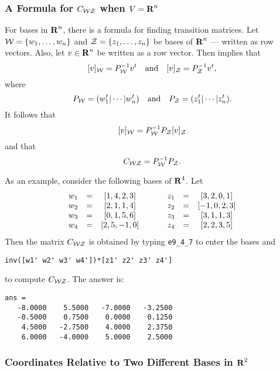 \subsubsection*{A Formula for $C_{\cal WZ}$ when $V=\mbox{$\bf{R}$}^n$}

For bases in $\mbox{$\bf{R}$}^n$, there is a formula for finding transition
matrices.  Let ${\cal W} =\{w_1,\ldots,w_n\}$
and ${\cal Z} = \{z_1,\ldots,z_n\}$ be bases of $\mbox{$\bf{R}$}^n$ --- written as row
vectors.
Also, let $v\in\mbox{$\bf{R}$}^n$ be written as a row vector.  Then 
implies that
\[
[v]_{\cal W} = P_{\cal W}^{-1} v^t \quad\mbox{and}\quad [v]_{\cal Z} = P_{\cal Z}^{-1} v^t,
\]
where
\[
P_{\cal W} = (w_1^t|\cdots|w_n^t) \quad\mbox{and}\quad  P_{\cal Z} = (z_1^t|\cdots|z_n^t).
\]
It follows that
\[
[v]_{\cal W} = P_{\cal W}^{-1} P_{\cal Z} [v]_{\cal Z}
\]
and that
\begin{equation} \label{e:coordformn}
C_{\cal WZ} = P_{\cal W}^{-1} P_{\cal Z}.
\end{equation}

As an example, consider the following bases of $\mbox{$\bf{R}$}^4$.  Let
\begin{equation*}
\begin{array}{ccccccc}
w_1 & = & [1, 4, 2, 3] & \hspace{0.2in} & z_1 & = & [3, 2, 0, 1] \\
w_2 & = & [2, 1, 1, 4] &  		    & z_2 & = & [-1, 0, 2, 3] \\
w_3 & = & [0, 1, 5, 6] & 		    & z_3 & = & [3, 1, 1, 3] \\
w_4 & = & [2, 5, -1, 0] & 		    & z_4 & = & [2, 2, 3, 5]
\end{array}
\end{equation*}
Then the matrix $C_{\cal WZ}$ is obtained by typing {\tt e9\_4\_7} to
enter the bases and
\begin{verbatim}
inv([w1' w2' w3' w4'])*[z1' z2' z3' z4']
\end{verbatim}
to compute $C_{\cal WZ}$.  The answer is:
\begin{verbatim}
ans =
   -8.0000    5.5000   -7.0000   -3.2500
   -0.5000    0.7500    0.0000    0.1250
    4.5000   -2.7500    4.0000    2.3750
    6.0000   -4.0000    5.0000    2.5000
\end{verbatim}



\subsubsection*{Coordinates Relative to Two Different Bases in $\mbox{$\bf{R}$}^2$}

